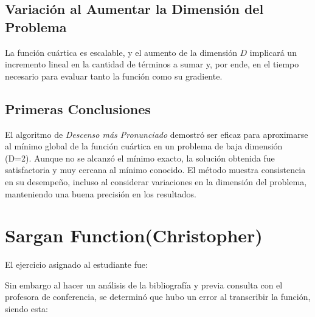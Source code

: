\documentclass{article}
\begin{document}
	
	\subsection{Variación al Aumentar la Dimensión del Problema}
	
	La función cuártica es escalable, y el aumento de la dimensión \(D\) implicará un incremento lineal en la cantidad de términos a sumar y, por ende, en el tiempo necesario para evaluar tanto la función como su gradiente.
	
	\subsection{Primeras Conclusiones}
	
	El algoritmo de \textit{Descenso más Pronunciado} demostró ser eficaz para aproximarse al mínimo global de la función cuártica en un problema de baja dimensión (D=2). Aunque no se alcanzó el mínimo exacto, la solución obtenida fue satisfactoria y muy cercana al mínimo conocido. El método muestra consistencia en su desempeño, incluso al considerar variaciones en la dimensión del problema, manteniendo una buena precisión en los resultados.

		
	
	\section{Sargan Function(Christopher)}
	
	El ejercicio asignado al estudiante fue:
	
	\vspace*{1cm}
	
	
	\vspace*{1cm}
	
	Sin embargo al hacer un análisis de la bibliografía \cite{reference29} y previa consulta con el profesora de conferencia, se determinó que hubo un error al transcribir la función, siendo esta:
	
\end{document}

